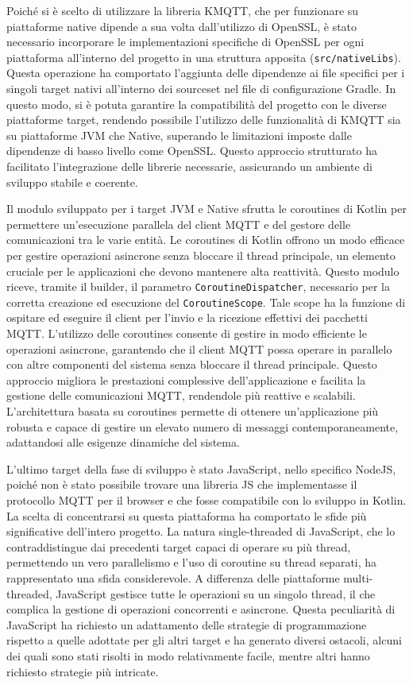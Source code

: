 \documentclass[12pt,a4paper,openright,twoside]{book}
\begin{document}
Poiché si è scelto di utilizzare la libreria KMQTT, che per funzionare su piattaforme native dipende a sua volta dall'utilizzo di OpenSSL, 
è stato necessario incorporare le implementazioni specifiche di OpenSSL per ogni piattaforma all'interno del progetto in una struttura apposita (\texttt{src/nativeLibs}). 
Questa operazione ha comportato l'aggiunta delle dipendenze ai file specifici per i singoli target nativi all'interno dei sourceset nel file di configurazione Gradle. 
In questo modo, si è potuta garantire la compatibilità del progetto con le diverse piattaforme target, rendendo possibile l'utilizzo delle funzionalità di KMQTT sia su 
piattaforme \ac{JVM} che Native, superando le limitazioni imposte dalle dipendenze di basso livello come OpenSSL. Questo approccio strutturato ha facilitato l'integrazione 
delle librerie necessarie, assicurando un ambiente di sviluppo stabile e coerente.

Il modulo sviluppato per i target \ac{JVM} e Native sfrutta le coroutines di Kotlin per permettere un'esecuzione parallela del client \ac{MQTT} e del gestore delle 
comunicazioni tra le varie entità. Le coroutines di Kotlin offrono un modo efficace per gestire operazioni asincrone senza bloccare il thread principale, un elemento cruciale 
per le applicazioni che devono mantenere alta reattività. Questo modulo riceve, tramite il builder, il parametro \texttt{CoroutineDispatcher}, necessario per la corretta 
creazione ed esecuzione del \texttt{CoroutineScope}. Tale scope ha la funzione di ospitare ed eseguire il client per l'invio e la ricezione effettivi dei pacchetti \ac{MQTT}.
L'utilizzo delle coroutines consente di gestire in modo efficiente le operazioni asincrone, garantendo che il client \ac{MQTT} possa operare in parallelo con altre componenti 
del sistema senza bloccare il thread principale. Questo approccio migliora le prestazioni complessive dell'applicazione e facilita la gestione delle comunicazioni \ac{MQTT}, 
rendendole più reattive e scalabili. L'architettura basata su coroutines permette di ottenere un'applicazione più robusta e capace di gestire un elevato numero di messaggi 
contemporaneamente, adattandosi alle esigenze dinamiche del sistema.

L'ultimo target della fase di sviluppo è stato JavaScript, nello specifico NodeJS, poiché non è stato possibile trovare una libreria \ac{JS} 
che implementasse il protocollo \ac{MQTT} per il browser e che fosse compatibile con lo sviluppo in Kotlin. La scelta di concentrarsi su questa piattaforma 
ha comportato le sfide più significative dell'intero progetto. La natura single-threaded di JavaScript, che lo contraddistingue dai precedenti target capaci 
di operare su più thread, permettendo un vero parallelismo e l'uso di coroutine su thread separati, ha rappresentato una sfida considerevole. 
A differenza delle piattaforme multi-threaded, JavaScript gestisce tutte le operazioni su un singolo thread, il che complica la gestione di operazioni concorrenti e asincrone. 
Questa peculiarità di JavaScript ha richiesto un adattamento delle strategie di programmazione rispetto a quelle adottate per gli altri target e ha generato diversi ostacoli, 
alcuni dei quali sono stati risolti in modo relativamente facile, mentre altri hanno richiesto strategie più intricate.
\end{document}

